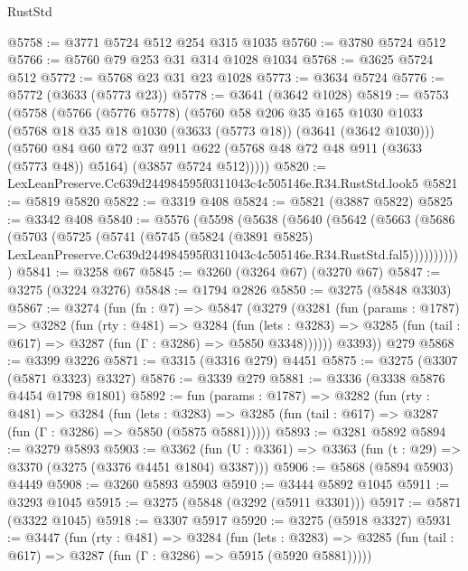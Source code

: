 \begin{lexlean}{RustStd}
\begin{coremodule}
@5758 := @3771 @5724 @512 @254 @315 @1035
@5760 := @3780 @5724 @512
@5766 := @5760 @79 @253 @31 @314 @1028 @1034
@5768 := @3625 @5724 @512
@5772 := @5768 @23 @31 @23 @1028
@5773 := @3634 @5724
@5776 := @5772 (@3633 (@5773 @23))
@5778 := @3641 (@3642 @1028)
@5819 := @5753
    (@5758
      (@5766
        (@5776 @5778)
        (@5760
          @58
          @206
          @35
          @165
          @1030
          @1033
          (@5768 @18 @35 @18 @1030 (@3633 (@5773 @18)) (@3641 (@3642 @1030)))
          (@5760
            @84
            @60
            @72
            @37
            @911
            @622
            (@5768 @48 @72 @48 @911 (@3633 (@5773 @48)) @5164)
            (@3857 @5724 @512)))))
@5820 := LexLeanPreserve.Cc639d244984595f0311043c4c505146e.R34.RustStd.look5
@5821 := @5819 @5820
@5822 := @3319 @408
@5824 := @5821 (@3887 @5822)
@5825 := @3342 @408
@5840 := @5576
    (@5598
      (@5638
        (@5640
          (@5642
            (@5663
              (@5686
                (@5703
                  (@5725
                    (@5741
                      (@5745
                        (@5824
                          (@3891 @5825)
                          LexLeanPreserve.Cc639d244984595f0311043c4c505146e.R34.RustStd.fal5)))))))))))
@5841 := @3258 @67
@5845 := @3260 (@3264 @67) (@3270 @67)
@5847 := @3275 (@3224 @3276)
@5848 := @1794 @2826
@5850 := @3275 (@5848 @3303)
@5867 := @3274
    (fun (fn : @7) =>
    @5847
      (@3279
        (@3281
          (fun (params : @1787) =>
          @3282
            (fun (rty : @481) =>
            @3284
              (fun (lets : @3283) =>
              @3285 (fun (tail : @617) => @3287 (fun (Γ : @3286) => @5850 @3348))))))
        @3393))
    @279
@5868 := @3399 @3226
@5871 := @3315 (@3316 @279) @4451
@5875 := @3275 (@3307 (@5871 @3323) @3327)
@5876 := @3339 @279
@5881 := @3336 (@3338 @5876 @4454 @1798 @1801)
@5892 := fun (params : @1787) =>
  @3282
    (fun (rty : @481) =>
    @3284
      (fun (lets : @3283) =>
      @3285 (fun (tail : @617) => @3287 (fun (Γ : @3286) => @5850 (@5875 @5881)))))
@5893 := @3281 @5892
@5894 := @3279 @5893
@5903 := @3362 (fun (U : @3361) => @3363 (fun (t : @29) => @3370 (@3275 (@3376 @4451 @1804) @3387)))
@5906 := @5868 (@5894 @5903) @4449
@5908 := @3260 @5893 @5903
@5910 := @3444 @5892 @1045
@5911 := @3293 @1045
@5915 := @3275 (@5848 (@3292 (@5911 @3301)))
@5917 := @5871 (@3322 @1045)
@5918 := @3307 @5917
@5920 := @3275 (@5918 @3327)
@5931 := @3447
    (fun (rty : @481) =>
    @3284
      (fun (lets : @3283) =>
      @3285 (fun (tail : @617) => @3287 (fun (Γ : @3286) => @5915 (@5920 @5881)))))

\end{coremodule}
\end{lexlean}

